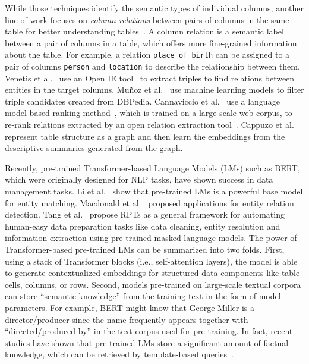 \documentclass[sigconf]{acmart}
\begin{document}
While those techniques identify the semantic types of individual columns, 
another line of work focuses on {\em column relations} between pairs of columns in the same table for better understanding tables~\cite{Limaye:2010:VLDB:AnnotatingWebTables,Venetis:2011:VLDB:RecoveringSemantics,Munoz:2014:WSDM:UsingLinkedData,Cannaviccio:2018:WWW:TowardsAnnotationgRelational,Macdonald:2020:CIKM:NeuralRelationExtraction,Deng:2020:TURL}.
%
A column relation is a semantic label between a pair of columns in a table, which offers more fine-grained information about the table. For example, a relation {\tt place\_of\_birth} can be assigned to a pair of columns {\tt person} and {\tt location} to describe the relationship between them.
%
Venetis et al.~\cite{Venetis:2011:VLDB:RecoveringSemantics} use an Open IE tool~\cite{Yates:2007:NAACL:TextRunner} to extract triples to find relations between entities in the target columns. 
%
Mu\~{n}oz et al.~\cite{Munoz:2014:WSDM:UsingLinkedData} use machine learning models to filter triple candidates created from DBPedia. 
%
Cannaviccio et al.~\cite{Cannaviccio:2018:WWW:TowardsAnnotationgRelational} use a language model-based ranking method~\cite{Zhai:2008:LM4IR}, which is trained on a large-scale web corpus, to re-rank relations extracted by an open relation extraction tool~\cite{Nakashole:2012:PATTY}.
%
Cappuzo et al.~\cite{Cappuzzo:2020:SIGMOD:CreatingEmbeddings} represent table structure as a graph and then learn the embeddings from the descriptive summaries generated from the graph.


Recently, pre-trained  Transformer-based Language Models (LMs) such as BERT, which were originally designed for NLP tasks, have shown success in data management tasks. Li et al.~\cite{Li:2020:Ditto} show that pre-trained LMs is a powerful base model for entity matching. Macdonald et al.~\cite{Macdonald:2020:CIKM:NeuralRelationExtraction} proposed applications for entity relation detection. Tang et al.~\cite{Tang:2020:RelationalPretrained} propose RPTs as a general framework for automating human-easy data preparation tasks like data cleaning, entity resolution and information extraction using pre-trained masked language models.
%
The power of Transformer-based pre-trained LMs can be summarized into two folds. First, using a stack of Transformer blocks (i.e., self-attention layers), the model is able to generate contextualized embeddings for structured data components like table cells, columns, or rows. Second, models pre-trained on large-scale textual corpora can store ``semantic knowledge'' from the training text in the form of model parameters. For example, BERT might know that George Miller is a director/producer since the name frequently appears together with ``directed/produced by'' in the text corpus used for pre-training. 
%
In fact, recent studies have shown that pre-trained LMs store a significant amount of factual knowledge, which can be retrieved by template-based queries~\cite{Petroni:2019:LAMA,Jiang:2020:HowCanWeKnowLM,Roberts:2020:HowMuchKnowledge}.
%
\end{document}

